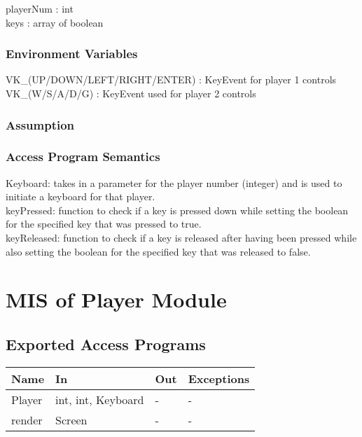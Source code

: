 \documentclass[12pt, letterpaper]{article}
\begin{document}
	playerNum : int \\
	keys : array of boolean \\
	
	\subsubsection{Environment Variables}
	
	VK\_(UP/DOWN/LEFT/RIGHT/ENTER) : KeyEvent for player 1 controls\\
	VK\_(W/S/A/D/G) : KeyEvent used for player 2 controls\\
	
	\subsubsection{Assumption}
	
	\subsubsection{Access Program Semantics}
	
	Keyboard: takes in a parameter for the player number (integer) and is used \indent to initiate a keyboard for that player.\\
	keyPressed: function to check if a key is pressed down while setting the \indent boolean for the specified key that was pressed to true.\\
	keyReleased: function to check if a key is released after having been pressed \indent while also setting the boolean for the specified key that was released to \indent false.\\
	
	\section{MIS of Player Module}
	
	\subsection{Exported Access Programs}
	
			\begin{center}
				\begin{tabular}{ p{4cm} p{3cm} p{3cm} p{4cm} }
					\hline
					\textbf{Name} & \textbf{In} & \textbf{Out} & \textbf{Exceptions}\\ 
					\hline
					Player & int, int, Keyboard & - & -  \\ 
					render & Screen & - & - \\
					\hline
					
				\end{tabular}				
			\end{center}
	
\end{document}
